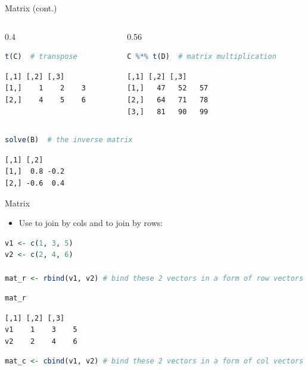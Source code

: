 \begin{frame}[fragile]{Matrix (cont.)}
\begin{columns}[T]
\begin{column}{0.4\textwidth}
\begin{lstlisting}[language=R]
t(C)  # transpose
\end{lstlisting}
\begin{lstlisting}[style=output]
     [,1] [,2] [,3]
[1,]    1    2    3
[2,]    4    5    6
\end{lstlisting}
\end{column}
\begin{column}{0.56\textwidth}
\begin{lstlisting}[language=R]
C %*% t(D)  # matrix multiplication
\end{lstlisting}
\begin{lstlisting}[style=output]
     [,1] [,2] [,3]
[1,]   47   52   57
[2,]   64   71   78
[3,]   81   90   99
\end{lstlisting}
\end{column}
\end{columns}
\begin{lstlisting}[language=R]
solve(B)  # the inverse matrix
\end{lstlisting}
\begin{lstlisting}[style=output]
     [,1] [,2]
[1,]  0.8 -0.2
[2,] -0.6  0.4
\end{lstlisting}
\end{frame}

\begin{frame}[fragile]{Matrix}
\begin{itemize}
  \item Use  to join by cols and  to join by rows:
\end{itemize}
\begin{lstlisting}[language=R]
v1 <- c(1, 3, 5)
v2 <- c(2, 4, 6)

mat_r <- rbind(v1, v2) # bind these 2 vectors in a form of row vectors
\end{lstlisting}
\begin{lstlisting}[language=R]
mat_r
\end{lstlisting}
\begin{lstlisting}[style=output]
   [,1] [,2] [,3]
v1    1    3    5
v2    2    4    6
\end{lstlisting}
\begin{lstlisting}[language=R]
mat_c <- cbind(v1, v2) # bind these 2 vectors in a form of col vectors
\end{lstlisting}
\end{frame}

